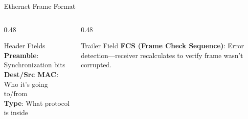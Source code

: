 \documentclass[aspectratio=169]{beamer}  %
\begin{document}
\begin{frame}{Ethernet Frame Format}
    \vspace{0.3em}
    \begin{columns}[T]
        \begin{column}{0.48\textwidth}
            \begin{block}{Header Fields}
                \small
                \textbf{Preamble}: Synchronization bits \\
                \textbf{Dest/Src MAC}: Who it's going to/from \\
                \textbf{Type}: What protocol is inside
            \end{block}
        \end{column}
        \begin{column}{0.48\textwidth}
            \begin{block}{Trailer Field}
                \small
                \textbf{FCS (Frame Check Sequence)}: Error detection---receiver recalculates to verify frame wasn't corrupted.
            \end{block}
        \end{column}
    \end{columns}
\end{frame}
\end{document}
